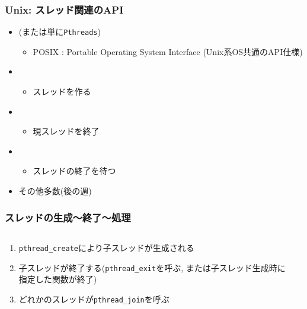 \documentclass[12pt,dvipdfmx]{beamer}
\begin{document}
\begin{frame}
\frametitle{Unix: スレッド関連のAPI}
\begin{itemize}
\item {} (または単に{\tt Pthreads})
  \begin{itemize}
  \item POSIX : Portable Operating System Interface (Unix系OS共通のAPI仕様)
  \end{itemize}
\item {}
  \begin{itemize}
  \item スレッドを作る
  \end{itemize}
\item {}
  \begin{itemize}
  \item 現スレッドを終了
  \end{itemize}
\item {}
  \begin{itemize}
  \item スレッドの終了を待つ
  \end{itemize}
\item その他多数(後の週)
\end{itemize}
\end{frame}
  
\begin{frame}
\frametitle{スレッドの生成〜終了〜処理}
\begin{columns}
  \begin{column}{0.5\textwidth}
    \begin{enumerate}
    \item<2-> {\tt pthread\_create}により子スレッドが生成される
    \item<4-> 子スレッドが終了する({\tt pthread\_exit}を呼ぶ,
      または子スレッド生成時に指定した関数が終了)
    \item<6-> どれかのスレッドが{\tt pthread\_join}を呼ぶ
    \end{enumerate}
  \end{column}
  \begin{column}{0.5\textwidth}
\begin{center}
%
%
%
%
%
%
\end{center}
  \end{column}
\end{columns}
\end{frame}
\end{document}
